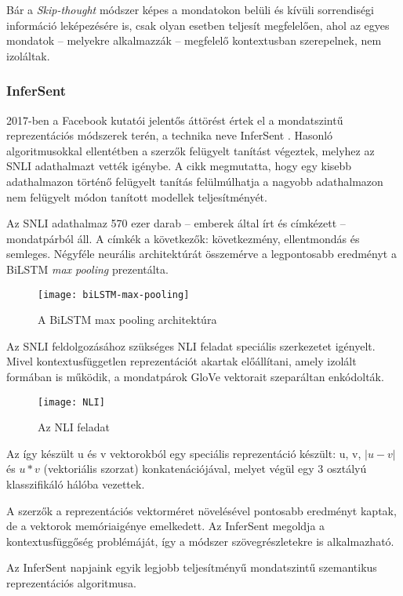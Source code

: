 Bár a \textit{Skip-thought} módszer képes a mondatokon belüli és kívüli sorrendiségi információ leképezésére is, csak olyan esetben teljesít megfelelően, ahol az egyes mondatok – melyekre alkalmazzák – megfelelő kontextusban szerepelnek, nem izoláltak.

\subsubsection{InferSent}
2017-ben a Facebook kutatói jelentős áttörést értek el a mondatszintű reprezentációs módszerek terén, a technika neve InferSent \cite{infer}. Hasonló algoritmusokkal ellentétben a szerzők felügyelt tanítást végeztek, melyhez az SNLI adathalmazt \cite{snli} vették igénybe. A cikk megmutatta, hogy egy kisebb adathalmazon történő felügyelt tanítás felülmúlhatja a nagyobb adathalmazon nem felügyelt módon tanított modellek teljesítményét.

Az SNLI adathalmaz 570 ezer darab – emberek által írt és címkézett – mondatpárból áll. A címkék a következők: következmény, ellentmondás és semleges.
Négyféle neurális architektúrát összemérve a legpontosabb eredményt a BiLSTM \textit{max pooling} prezentálta. 

\begin{figure}[H]
	\centering
	\texttt{[image: biLSTM-max-pooling]}
	\caption{A BiLSTM max pooling architektúra}
\end{figure}

Az SNLI feldolgozásához szükséges NLI feladat speciális szerkezetet igényelt. Mivel kontextusfüggetlen reprezentációt akartak előállítani, amely izolált formában is működik, a mondatpárok GloVe vektorait szeparáltan enkódolták.

\begin{figure}[H]
	\centering
	\texttt{[image: NLI]}
	\caption{Az NLI feladat}
\end{figure}

Az így készült u és v vektorokból egy speciális reprezentáció készült: u, v, $\left| u - v \right|$ és $u \ast v$ (vektoriális szorzat) konkatenációjával, melyet végül egy 3 osztályú klasszifikáló hálóba vezettek.

A szerzők a reprezentációs vektorméret növelésével pontosabb eredményt kaptak, de a vektorok memóriaigénye emelkedett. Az InferSent megoldja a kontextusfüggőség problémáját, így a módszer szövegrészletekre is alkalmazható.

\begin{note}
	Az InferSent napjaink egyik legjobb teljesítményű mondatszintű szemantikus reprezentációs algoritmusa.
\end{note}

